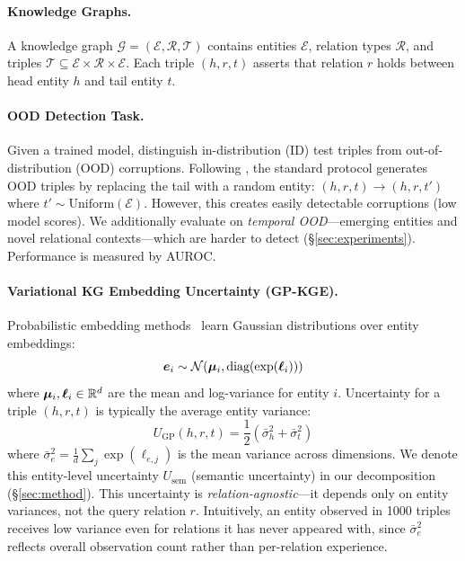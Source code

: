 
\paragraph{Knowledge Graphs.}
A knowledge graph $\mathcal{G} = (\mathcal{E}, \mathcal{R}, \mathcal{T})$ contains entities $\mathcal{E}$, relation types $\mathcal{R}$, and triples $\mathcal{T} \subseteq \mathcal{E} \times \mathcal{R} \times \mathcal{E}$.
Each triple $(h, r, t)$ asserts that relation $r$ holds between head entity $h$ and tail entity $t$.

\paragraph{OOD Detection Task.}
Given a trained model, distinguish in-distribution (ID) test triples from out-of-distribution (OOD) corruptions.
Following \citet{bordes2013translating}, the standard protocol generates OOD triples by replacing the tail with a random entity: $(h, r, t) \to (h, r, t')$ where $t' \sim \text{Uniform}(\mathcal{E})$.
However, this creates easily detectable corruptions (low model scores).
We additionally evaluate on \emph{temporal OOD}---emerging entities and novel relational contexts---which are harder to detect (\S\ref{sec:experiments}).
Performance is measured by AUROC.

\paragraph{Variational KG Embedding Uncertainty (GP-KGE).}
Probabilistic embedding methods~\citep{choudhary2021perm} learn Gaussian distributions over entity embeddings:
\begin{equation}
    \bm{e}_i \sim \mathcal{N}(\bm{\mu}_i, \text{diag}(\exp(\bm{\ell}_i)))
\end{equation}
where $\bm{\mu}_i, \bm{\ell}_i \in \mathbb{R}^d$ are the mean and log-variance for entity $i$.
Uncertainty for a triple $(h, r, t)$ is typically the average entity variance:
\begin{equation}
    U_{\text{GP}}(h, r, t) = \frac{1}{2}\left(\bar{\sigma}^2_h + \bar{\sigma}^2_t\right)
    \label{eq:gp_uncertainty}
\end{equation}
where $\bar{\sigma}^2_e = \frac{1}{d}\sum_j \exp(\ell_{e,j})$ is the mean variance across dimensions.
We denote this entity-level uncertainty $U_{\text{sem}}$ (semantic uncertainty) in our decomposition (\S\ref{sec:method}).
This uncertainty is \emph{relation-agnostic}---it depends only on entity variances, not the query relation $r$. Intuitively, an entity observed in 1000 triples receives low variance even for relations it has never appeared with, since $\bar{\sigma}^2_e$ reflects overall observation count rather than per-relation experience.

